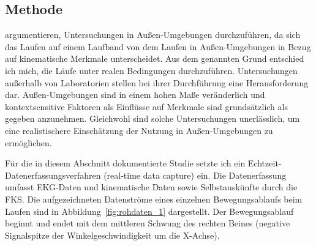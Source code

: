 \subsection{Methode} 

\label{sub:methode_5_1}

\citet[][S.~989]{Strohrmann2012} argumentieren, Untersuchungen in Außen-Umgebungen durchzuführen, da sich das Laufen auf einem Laufband von dem Laufen in Außen-Umgebungen in Bezug auf kinematische Merkmale unterscheidet. Aus dem genannten Grund entschied ich mich, die Läufe unter realen Bedingungen durchzuführen. Untersuchungen außerhalb von Laboratorien stellen bei ihrer Durchführung eine Herausforderung dar. Außen-Umgebungen sind in einem hohen Maße veränderlich und kontextsensitive Faktoren als Einflüsse auf Merkmale sind grundsätzlich als gegeben anzunehmen. Gleichwohl sind solche Untersuchungen unerlässlich, um eine realistischere Einschätzung der Nutzung in Außen-Umgebungen zu ermöglichen.

Für die in diesem Abschnitt dokumentierte Studie setzte ich ein Echtzeit-Datenerfassungsverfahren (real-time data capture) ein. Die Datenerfassung umfasst \ac{EKG}-Daten und kinematische Daten sowie Selbstauskünfte durch die \ac{FKS}. Die aufgezeichneten Datenströme eines einzelnen Bewegungsablaufs beim Laufen sind in Abbildung~\ref{fig:rohdaten_1} dargestellt. Der Bewegungsablauf beginnt und endet mit dem mittleren Schwung des rechten Beines (negative Signalspitze der Winkelgeschwindigkeit um die X-Achse). 
\begin{sidewaysfigure}
	\resizebox{1.00 
	\textwidth}{!}{
	
	 }
	
	\caption[Aufgenommene Datenströme (Erste Studie: Laufen)]{Aufgenommene Datenströme eines Bewegungsaublaufs in der ersten Studie zum Flow-Erleben beim Laufen -- von links nach rechts: \ac{EKG}-Ableitung RA-LL und \ac{EKG}-Ableitung LA-LL; Beschleunigung in X-Richtung und Winkelgeschwindigkeit um die X-Achse; Beschleunigung in Y-Richtung und Winkelgeschwindigkeit um die Y-Achse; Beschleunigung in Z-Richtung und Winkelgeschwindigkeit um die Z-Achse} \label{fig:rohdaten_1} 
\end{sidewaysfigure}

